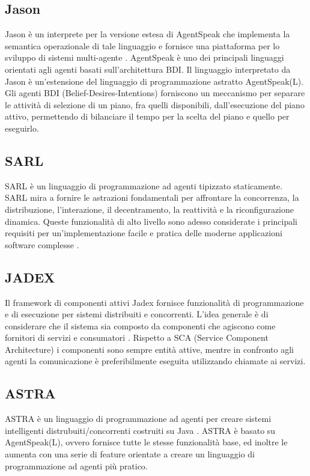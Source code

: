 \subsection*{Jason}
Jason è un interprete per la versione estesa di AgentSpeak che implementa la semantica operazionale di tale linguaggio e fornisce una piattaforma per lo sviluppo di sistemi multi-agente \cite{Jason}. AgentSpeak è uno dei principali linguaggi orientati agli agenti basati sull'architettura BDI. Il linguaggio interpretato da Jason è un'estensione del linguaggio di programmazione astratto AgentSpeak(L).
Gli agenti BDI (Belief-Desires-Intentions) forniscono un meccanismo per separare le attività di selezione di un piano, fra quelli disponibili, dall'esecuzione del piano attivo, permettendo di bilanciare il tempo per la scelta del piano e quello per eseguirlo.

\subsection*{SARL}
SARL è un linguaggio di programmazione ad agenti tipizzato staticamente. SARL mira a fornire le astrazioni fondamentali per affrontare la concorrenza, la distribuzione, l'interazione, il decentramento, la reattività e la riconfigurazione dinamica. Queste funzionalità di alto livello sono adesso considerate i principali requisiti per un'implementazione facile e pratica delle moderne applicazioni software complesse \cite{SARL}.

\subsection*{JADEX}
Il framework di componenti attivi Jadex fornisce funzionalità di programmazione e di esecuzione per sistemi distribuiti e concorrenti. L'idea generale è di considerare che il sistema sia composto da componenti che agiscono come fornitori di servizi e consumatori \cite{JADEX}.
Rispetto a SCA (Service Component Architecture) i componenti sono sempre entità attive, mentre in confronto agli agenti la comunicazione è preferibilmente eseguita utilizzando chiamate ai servizi.

\subsection*{ASTRA}
ASTRA è un linguaggio di programmazione ad agenti per creare sistemi intelligenti distrubuiti/concorrenti costruiti su Java \cite{Astra}.
%
ASTRA è basato su AgentSpeak(L), ovvero fornisce tutte le stesse funzionalità base, ed inoltre le aumenta con una serie di feature orientate a creare un linguaggio di programmazione ad agenti più pratico.


